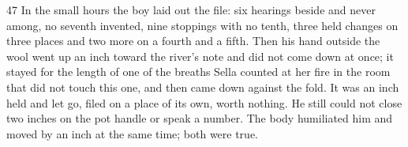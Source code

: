 \begin{CRchronicle}{47}
In the small hours the boy laid out the file: six hearings beside and never among, no seventh invented, nine stoppings with no tenth, three held changes on three places and two more on a fourth and a fifth. Then his hand outside the wool went up an inch toward the river’s note and did not come down at once; it stayed for the length of one of the breaths Sella counted at her fire in the room that did not touch this one, and then came down against the fold. It was an inch held and let go, filed on a place of its own, worth nothing. He still could not close two inches on the pot handle or speak a number. The body humiliated him and moved by an inch at the same time; both were true.
\end{CRchronicle}
